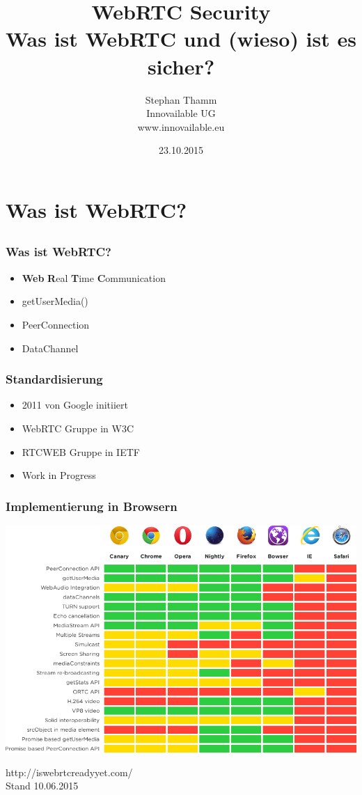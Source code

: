 \documentclass[12pt]{beamer}
\title{\huge WebRTC Security \\ \small Was ist WebRTC und (wieso) ist es sicher?}
\author{Stephan Thamm \\ Innovailable UG \\ www.innovailable.eu}
\date{23.10.2015}
\begin{document}
\maketitle

\frame{\tableofcontents[sections={1-4}]}


\section{Was ist WebRTC?}
\subsection{} 

\begin{frame}
  \frametitle{Was ist WebRTC?}
  \begin{itemize}
    \item<2-> \textbf{Web} \textbf{R}eal \textbf{T}ime \textbf{C}ommunication
    \item<3-> getUserMedia()
    \item<4-> PeerConnection
    \item<5-> DataChannel
  \end{itemize}
\end{frame}

\begin{frame}
  \frametitle{Standardisierung}
  \begin{itemize}
    \item<2-> 2011 von Google initiiert
    \item<3-> WebRTC Gruppe in W3C
    \item<4-> RTCWEB Gruppe in IETF
    \item<5-> Work in Progress
  \end{itemize}
\end{frame}

\begin{frame}
  \frametitle{Implementierung in Browsern}
  \pause
  \centerline{\includegraphics[height=0.7\textheight]{img/webrtc_ready.png}}
  \hfill \tiny http://iswebrtcreadyyet.com/ \\
  \hfill \tiny Stand 10.06.2015
\end{frame}
\end{document}
